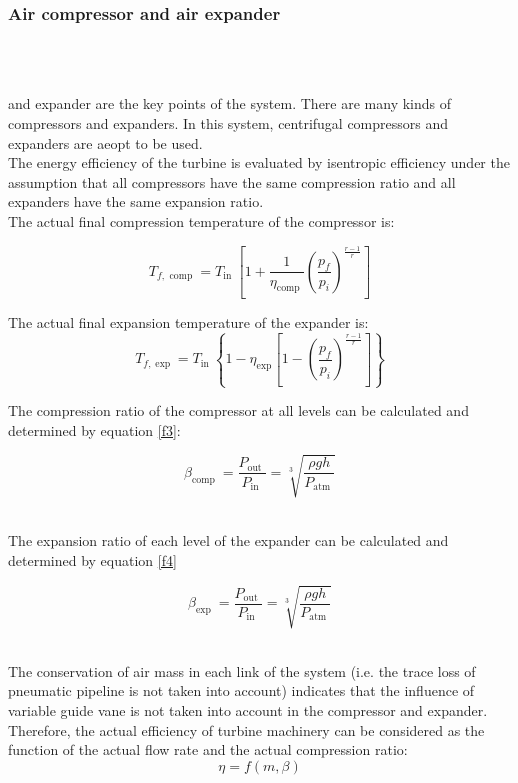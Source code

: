 \documentclass[journal,onecolumn]{IEEEtran}
\begin{document}
\subsubsection{Air compressor and air expander}\ \\\ 

 and expander are the key points of the system. There are many kinds of compressors and expanders. In this system, centrifugal compressors and expanders are aeopt to be used.\\

The energy efficiency of the turbine is evaluated by isentropic efficiency under the assumption that all compressors have the same compression ratio and all expanders have the same expansion ratio.\\

The actual final compression temperature of the compressor is:

\begin{equation}
	T_{f, \text { comp }}=T_{\text {in }}\left[1+\frac{1}{\eta_{\text {comp }}}\left(\frac{p_{f}}{p_{i}}\right)^{\frac{r-1}{r}}\right]
	\label{f1}
\end{equation}


The actual final expansion temperature of the expander is:
\begin{equation}
T_{f, \exp }=T_{\text {in }}\left\{1-\eta_{\exp }\left[1-\left(\frac{p_{f}}{p_{i}}\right)^{\frac{r-1}{r}}\right]\right\}
\label{f2}
\end{equation}


The compression ratio of the compressor at all levels can be calculated and determined by equation \ref{f3}:

\begin{equation}
\beta_{\text {comp }}=\frac{P_{\text {out }}}{P_{\text {in }}}=\sqrt[3]{\frac{\rho g h }{P_{\text {atm }} }}
\label{f3}
\end{equation}\ 

The expansion ratio of each level of the expander can be calculated and determined by equation \ref{f4}

\begin{equation}
\beta_{\text {exp }}=\frac{P_{\text {out }}}{P_{\text {in }}}=\sqrt[3]{\frac{\rho g h }{P_{\text {atm }} }}
\label{f4}
\end{equation}\ 

The conservation of air mass in each link of the system (i.e. the trace loss of pneumatic pipeline is not taken into account) indicates that the influence of variable guide vane is not taken into account in the compressor and expander. Therefore, the actual efficiency of turbine machinery can be considered as the function of the actual flow rate and the actual compression ratio:
\begin{equation}
	\eta=f(m, \beta)
	\label{f5}
\end{equation}
\end{document}
